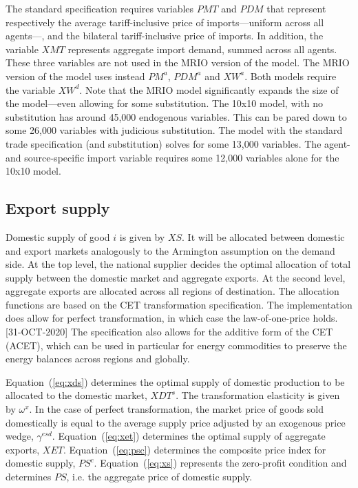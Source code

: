 \documentclass[11pt,letterpaper]{report}
\begin{document}
The standard specification requires variables $\mathit{PMT}$ and $\mathit{PDM}$
that represent respectively the average tariff-inclusive price of
imports---uniform across all agents---, and the bilateral tariff-inclusive price
of imports. In addition, the variable $\mathit{XMT}$ represents aggregate import
demand, summed across all agents. These three variables are not used in the MRIO
version of the model. The MRIO version of the model uses instead
$\mathit{PM}^a$, $\mathit{PDM}^a$ and $\mathit{XW}^a$. Both models require the
variable $\mathit{XW}^d$. Note that the MRIO model significantly expands the
size of the model---even allowing for some substitution. The 10x10 model, with
no substitution has around 45,000 endogenous variables. This can be pared down
to some 26,000 variables with judicious substitution. The model with the
standard trade specification (and substitution) solves for some 13,000
variables. The agent- and source-specific import variable requires some 12,000
variables alone for the 10x10 model.

\subsection{Export supply}

Domestic supply of good $i$ is given by $\mathit{XS}$. It will be allocated
between domestic and export markets analogously to the Armington assumption on
the demand side. At the top level, the national supplier decides the optimal
allocation of total supply between the domestic market and aggregate exports. At
the second level, aggregate exports are allocated across all regions of
destination. The allocation functions are based on the CET transformation
specification. The implementation does allow for perfect transformation, in
which case the law-of-one-price holds. [31-OCT-2020] The specification
also allows for the additive form of the CET (ACET), which can be
used in particular for energy commodities to preserve the
energy balances across regions and globally.

Equation~(\ref{eq:xds}) determines the optimal supply of domestic production to
be allocated to the domestic market, $\mathit{XDT^s}$. The transformation
elasticity is given by $\omega^x$. In the case of perfect transformation, the
market price of goods sold domestically is equal to the average supply price
adjusted by an exogenous price wedge, $\gamma^{\mathit{esd}}$.
Equation~(\ref{eq:xet}) determines the optimal supply of aggregate exports,
$\mathit{XET}$.
Equation~(\ref{eq:psc}) determines the composite price index for domestic supply, $\mathit{PS}^c$.
Equation~(\ref{eq:xs}) represents the zero-profit condition and determines
$\mathit{PS}$, i.e. the aggregate price of domestic supply.
\end{document}
